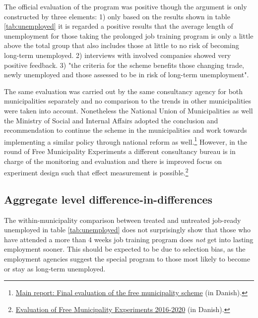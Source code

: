 \label{sec:empirics}
The official evaluation of the program was positive though the argument is only constructed by three elements: 1) only based on the results shown in table \ref{tab:unemployed} it is regarded a positive results that the average length of unemployment for those taking the prolonged job training program is only a little above the total group that also includes those at little to no risk of becoming long-term unemployed. 2) interviews with involved companies showed very positive feedback. 3) "the criteria for the scheme benefits those changing trade, newly unemployed and those assessed to be in risk of long-term unemployment".

The same evaluation was carried out by the same consultancy agency for both municipalities separately and no comparison to the trends in other municipalities were taken into account. Nonetheless the National Union of Municipalities as well the Ministry of Social and Internal Affairs adopted the conclusion and recommendation to continue the scheme in the municipalities and work towards implementing a similar policy through national reform as well.\footnote{\href{https://oim.dk/media/18130/slutevaluering-af-frikommuneordningen_lang-rapport.pdf}{Main report: Final evaluation of the free municipality scheme} (in Danish).} However, in the  round of Free Municipality Experiments a different consultancy bureau is in charge of the monitoring and evaluation and there is improved focus on experiment design such that effect measurement is possible.\footnote{\href{https://www.kora.dk/aktuelt/undersoegelser-i-gang/projekt/i13208/Frikommuneenvaluering}{Evaluation of Free Municipality Experiments 2016-2020} (in Danish).}

\subsection{Aggregate level difference-in-differences}
The within-municipality comparison between treated and untreated job-ready unemployed in table \ref{tab:unemployed} does not surprisingly show that those who have attended a more than 4 weeks job training program does \textit{not} get into lasting employment sooner. This should be expected to be due to selection bias, as the employment agencies suggest the special program to those most likely to become or stay as long-term unemployed.

